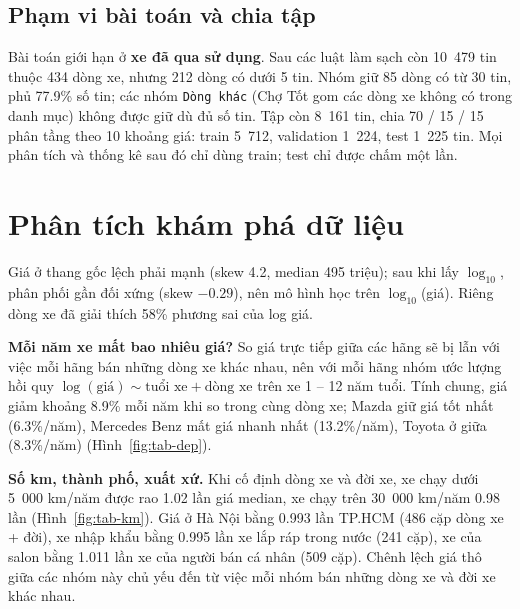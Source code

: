 \subsection{Phạm vi bài toán và chia tập}

Bài toán giới hạn ở \textbf{xe đã qua sử dụng}. Sau các luật làm sạch còn 10~479 tin thuộc 434 dòng xe, nhưng 212 dòng
có dưới 5 tin. Nhóm giữ 85 dòng có từ 30 tin, phủ 77.9\% số tin; các nhóm \texttt{Dòng khác} (Chợ Tốt gom các dòng xe
không có trong danh mục) không được giữ dù đủ số tin. Tập còn 8~161 tin, chia 70 / 15 / 15 phân tầng theo 10 khoảng giá:
train 5~712, validation 1~224, test 1~225 tin. Mọi phân tích và thống kê sau đó chỉ dùng train; test chỉ được chấm một
lần.

\section{Phân tích khám phá dữ liệu}\label{sec:tab-eda}

Giá ở thang gốc lệch phải mạnh (skew 4.2, median 495 triệu); sau khi lấy $\log_{10}$, phân phối gần đối xứng (skew
$-0.29$), nên mô hình học trên $\log_{10}$(giá). Riêng dòng xe đã giải thích 58\% phương sai của log giá.

\textbf{Mỗi năm xe mất bao nhiêu giá?} So giá trực tiếp giữa các hãng sẽ bị lẫn với việc mỗi hãng bán những dòng xe khác
nhau, nên với mỗi hãng nhóm ước lượng hồi quy $\log(\text{giá}) \sim \text{tuổi xe} + \text{dòng xe}$ trên xe 1 -- 12
năm tuổi. Tính chung, giá giảm khoảng 8.9\% mỗi năm khi so trong cùng dòng xe; Mazda giữ giá tốt nhất (6.3\%/năm),
Mercedes Benz mất giá nhanh nhất (13.2\%/năm), Toyota ở giữa (8.3\%/năm) (Hình~\ref{fig:tab-dep}).


\textbf{Số km, thành phố, xuất xứ.} Khi cố định dòng xe và đời xe, xe chạy dưới 5~000 km/năm được rao 1.02 lần giá
median, xe chạy trên 30~000 km/năm 0.98 lần (Hình~\ref{fig:tab-km}). Giá ở Hà Nội bằng 0.993 lần TP.HCM (486 cặp dòng
xe + đời), xe nhập khẩu bằng 0.995 lần xe lắp ráp trong nước (241 cặp), xe của salon bằng 1.011 lần xe của người bán cá
nhân (509 cặp). Chênh lệch giá thô giữa các nhóm này chủ yếu đến từ việc mỗi nhóm bán những dòng xe và đời xe khác nhau.


